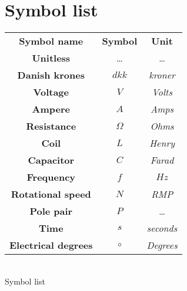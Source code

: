 \section{Symbol list}

\begin{center}
\begin{tabular}{|c|c|c|} \cline{1-3}
\textbf{Symbol name} & \textbf{Symbol} & \textbf{Unit} \\ \cline{1-3}
\textbf{Unitless} & \dots & \dots \\ \cline{1-3}
\textbf{Danish krones} & $dkk$ & \textit{kroner} \\ \cline{1-3}
\textbf{Voltage} & $V$ & \textit{Volts} \\ \cline{1-3}
\textbf{Ampere} & $A$ & \textit{Amps} \\ \cline{1-3}
\textbf{Resistance} & $\Omega$ & \textit{Ohms} \\ \cline{1-3}
\textbf{Coil} & $L$ & \textit{Henry} \\ \cline{1-3}
\textbf{Capacitor} & $C$ & \textit{Farad} \\ \cline{1-3}
\textbf{Frequency} & $f$ & $Hz$\\ \cline{1-3} 
\textbf{Rotational speed} & $N$ & \textit{RMP}\\ \cline{1-3}
\textbf{Pole pair} & $P$ & \dots \\ \cline{1-3}
\textbf{Time} & $s$ & \textit{seconds} \\ \cline{1-3}
\textbf{Electrical degrees} & $\circ$ & \textit{Degrees} \\ \cline{1-3}
\end{tabular} \\
\caption{Symbol list}\label{Symbollist}
\label{tab:variable_ids}
\end{center}
